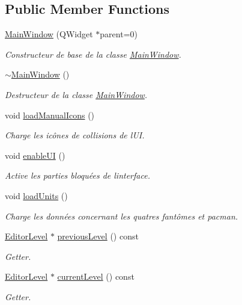 \subsection*{Public Member Functions}
\begin{DoxyCompactItemize}
\item 
\hyperlink{class_main_window_a8b244be8b7b7db1b08de2a2acb9409db}{Main\+Window} (Q\+Widget $\ast$parent=0)
\begin{DoxyCompactList}\small\item\em Constructeur de base de la classe \hyperlink{class_main_window}{Main\+Window}. \end{DoxyCompactList}\item 
\hyperlink{class_main_window_ae98d00a93bc118200eeef9f9bba1dba7}{$\sim$\+Main\+Window} ()
\begin{DoxyCompactList}\small\item\em Destructeur de la classe \hyperlink{class_main_window}{Main\+Window}. \end{DoxyCompactList}\item 
void \hyperlink{class_main_window_aedd6630471c13974c06edbf3a6813408}{load\+Manual\+Icons} ()
\begin{DoxyCompactList}\small\item\em Charge les icônes de collisions de l\textquotesingle{}U\+I. \end{DoxyCompactList}\item 
void \hyperlink{class_main_window_a98b4b0619a6464a3986137f27e2b33fc}{enable\+U\+I} ()
\begin{DoxyCompactList}\small\item\em Active les parties bloquées de l\textquotesingle{}interface. \end{DoxyCompactList}\item 
\hypertarget{class_main_window_af0059abfb02a0e9c895ecd1fb17ab1e5}{}void \hyperlink{class_main_window_af0059abfb02a0e9c895ecd1fb17ab1e5}{load\+Units} ()\label{class_main_window_af0059abfb02a0e9c895ecd1fb17ab1e5}

\begin{DoxyCompactList}\small\item\em Charge les données concernant les quatres fantômes et pacman. \end{DoxyCompactList}\item 
\hyperlink{class_editor_level}{Editor\+Level} $\ast$ \hyperlink{class_main_window_ac9a5e1e79e55b0cd92da3e2687c55fc4}{previous\+Level} () const 
\begin{DoxyCompactList}\small\item\em Getter. \end{DoxyCompactList}\item 
\hyperlink{class_editor_level}{Editor\+Level} $\ast$ \hyperlink{class_main_window_aa64d0d953be0a0d92beef47f123a3071}{current\+Level} () const 
\begin{DoxyCompactList}\small\item\em Getter. \end{DoxyCompactList}\end{DoxyCompactItemize}
